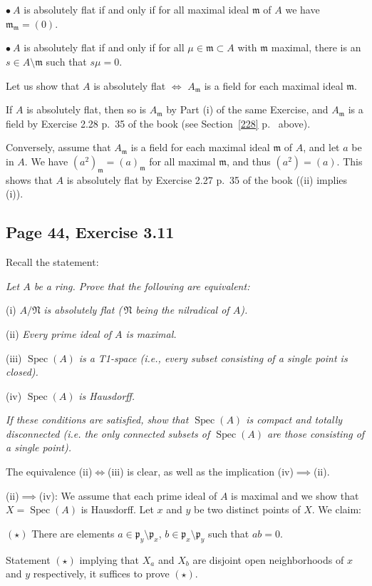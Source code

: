 \documentclass[parskip=half,fontsize=12pt]{scrartcl}%
\newcommand{\oo}{\operatorname}\newcommand{\ooo}{\operatorname*}
\newcommand{\mf}{\mathfrak}
\newcommand{\mmm}{\mf m}
\newcommand{\ppp}{\mf p}
\newcommand{\bu}{\bullet}
\newcommand{\Spec}{\operatorname{Spec}}\newcommand{\Sp}{\operatorname{Spec}}
\begin{document}
$\bu\ A$ is absolutely flat if and only if for all maximal ideal $\mmm$ of $A$ we have $\mmm_\mmm=(0)$.

$\bu\ A$ is absolutely flat if and only if for all $\mu\in\mmm\subset A$ with $\mmm$ maximal, there is an $s\in A\setminus\mmm$ such that $s\mu=0$. 

Let us show that $A$ is absolutely flat $\iff$ $A_\mmm$ is a field for each maximal ideal $\mmm$. 

If $A$ is absolutely flat, then so is $A_\mmm$ by Part (i) of the same Exercise, and $A_\mmm$ is a field by Exercise 2.28 p.~35 of the book (see Section~\ref{228} p.~\pageref{228} above). 

Conversely, assume that $A_\mmm$ is a field for each maximal ideal $\mmm$ of $A$, and let $a$ be in $A$. We have $(a^2)_\mmm=(a)_\mmm$ for all maximal $\mmm$, and thus $(a^2)=(a)$. This shows that $A$ is absolutely flat by Exercise 2.27 p.~35 of the book ((ii) implies (i)).

\subsection{Page 44, Exercise 3.11}%

Recall the statement:

\emph{Let $A$ be a ring. Prove that the following are equivalent:}

(i) $A/\mf N$ \emph{is absolutely flat ($\,\mf N$ being the nilradical of $A$).}

(ii) \emph{Every prime ideal of $A$ is maximal.}

(iii)  $\Spec(A)$ \emph{is a T1-space (i.e., every subset consisting of a single point is closed).}

(iv) $\Spec(A)$ \emph{is Hausdorff.}

\emph{If these conditions are satisfied, show that $\Spec(A)$ is compact and totally disconnected (i.e. the only connected subsets of $\Spec(A)$ are those consisting of a single point).}

The equivalence (ii)$\iff$(iii) is clear, as well as the implication (iv)$\implies$(ii).

(ii)$\implies$(iv): We assume that each prime ideal of $A$ is maximal and we show that $X=\oo{Spec}(A)$ is Hausdorff. Let $x$ and $y$ be two distinct points of $X$. We claim:

$(\star)$ There are elements $a\in\ppp_y\setminus\ppp_x$, $b\in\ppp_x\setminus\ppp_y$ such that $ab=0$.

Statement $(\star)$ implying that $X_a$ and $X_b$ are disjoint open neighborhoods of $x$ and $y$ respectively, it suffices to prove $(\star)$.
\end{document}
